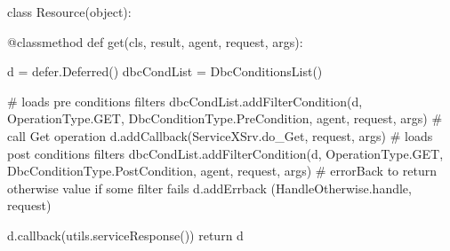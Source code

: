class Resource(object): 
 
    @classmethod
    def get(cls, result, agent, request, args):

        d = defer.Deferred()
        dbcCondList = DbcConditionsList()
        
        # loads pre conditions filters
        dbcCondList.addFilterCondition(d, OperationType.GET, DbcConditionType.PreCondition, agent, request, args)
        # call Get operation
        d.addCallback(ServiceXSrv.do_Get,      request, args)
        # loads post conditions filters
        dbcCondList.addFilterCondition(d, OperationType.GET, DbcConditionType.PostCondition, agent, request, args)
        # errorBack to return otherwise value if some filter fails
        d.addErrback (HandleOtherwise.handle, request)
        
        d.callback(utils.serviceResponse())
        return d